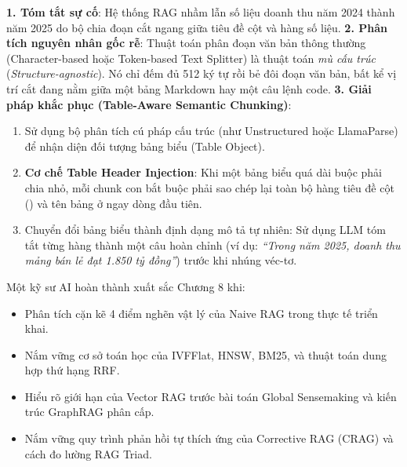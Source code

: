 \begin{debugbox}
\textbf{1. Tóm tắt sự cố}: Hệ thống RAG nhầm lẫn số liệu doanh thu năm 2024 thành năm 2025 do bộ chia đoạn cắt ngang giữa tiêu đề cột và hàng số liệu.
\textbf{2. Phân tích nguyên nhân gốc rễ}:
Thuật toán phân đoạn văn bản thông thường (Character-based hoặc Token-based Text Splitter) là thuật toán \textit{mù cấu trúc} (\textit{Structure-agnostic}). Nó chỉ đếm đủ 512 ký tự rồi bẻ đôi đoạn văn bản, bất kể vị trí cắt đang nằm giữa một bảng Markdown hay một câu lệnh code.
\textbf{3. Giải pháp khắc phục (Table-Aware Semantic Chunking)}:
\begin{enumerate}
  \item Sử dụng bộ phân tích cú pháp cấu trúc (như Unstructured hoặc LlamaParse) để nhận diện đối tượng bảng biểu (Table Object).
  \item \textbf{Cơ chế Table Header Injection}: Khi một bảng biểu quá dài buộc phải chia nhỏ, mỗi chunk con bắt buộc phải sao chép lại toàn bộ hàng tiêu đề cột () và tên bảng ở ngay dòng đầu tiên.
  \item Chuyển đổi bảng biểu thành định dạng mô tả tự nhiên: Sử dụng LLM tóm tắt từng hàng thành một câu hoàn chỉnh (ví dụ: \textit{``Trong năm 2025, doanh thu mảng bán lẻ đạt 1.850 tỷ đồng''}) trước khi nhúng véc-tơ.
\end{enumerate}
\end{debugbox}

\begin{checkpointbox}
Một kỹ sư AI hoàn thành xuất sắc Chương 8 khi:
\begin{itemize}
  \item Phân tích cặn kẽ 4 điểm nghẽn vật lý của Naive RAG trong thực tế triển khai.
  \item Nắm vững cơ sở toán học của IVFFlat, HNSW, BM25, và thuật toán dung hợp thứ hạng RRF.
  \item Hiểu rõ giới hạn của Vector RAG trước bài toán Global Sensemaking và kiến trúc GraphRAG phân cấp.
  \item Nắm vững quy trình phản hồi tự thích ứng của Corrective RAG (CRAG) và cách đo lường RAG Triad.
\end{itemize}
\end{checkpointbox}
